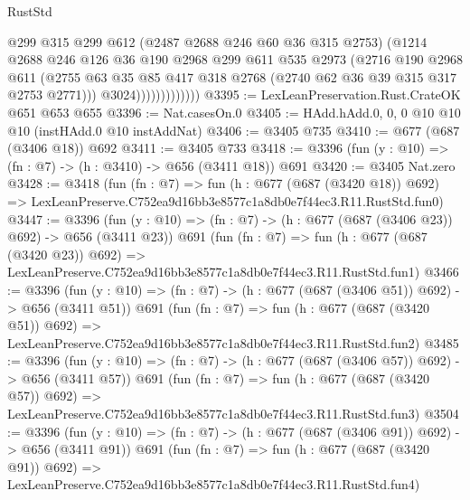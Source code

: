 \begin{lexlean}{RustStd}
\begin{coremodule}
                            @299
                            @315
                            @299
                            @612
                            (@2487 @2688 @246 @60 @36 @315 @2753)
                            (@1214
                              @2688
                              @246
                              @126
                              @36
                              @190
                              @2968
                              @299
                              @611
                              @535
                              @2973
                              (@2716
                                @190
                                @2968
                                @611
                                (@2755
                                  @63
                                  @35
                                  @85
                                  @417
                                  @318
                                  @2768
                                  (@2740 @62 @36 @39 @315 @317 @2753 @2771)))
                              @3024)))))))))))))
@3395 := LexLeanPreservation.Rust.CrateOK @651 @653 @655
@3396 := Nat.casesOn.{0}
@3405 := HAdd.hAdd.{0, 0, 0} @10 @10 @10 (instHAdd.{0} @10 instAddNat)
@3406 := @3405 @735
@3410 := @677 (@687 (@3406 @18)) @692
@3411 := @3405 @733
@3418 := @3396 (fun (y : @10) => (fn : @7) -> (h : @3410) -> @656 (@3411 @18)) @691
@3420 := @3405 Nat.zero
@3428 := @3418
    (fun (fn : @7) =>
    fun (h : @677 (@687 (@3420 @18)) @692) =>
    LexLeanPreserve.C752ea9d16bb3e8577c1a8db0e7f44ec3.R11.RustStd.fun0)
@3447 := @3396
    (fun (y : @10) => (fn : @7) -> (h : @677 (@687 (@3406 @23)) @692) -> @656 (@3411 @23))
    @691
    (fun (fn : @7) =>
    fun (h : @677 (@687 (@3420 @23)) @692) =>
    LexLeanPreserve.C752ea9d16bb3e8577c1a8db0e7f44ec3.R11.RustStd.fun1)
@3466 := @3396
    (fun (y : @10) => (fn : @7) -> (h : @677 (@687 (@3406 @51)) @692) -> @656 (@3411 @51))
    @691
    (fun (fn : @7) =>
    fun (h : @677 (@687 (@3420 @51)) @692) =>
    LexLeanPreserve.C752ea9d16bb3e8577c1a8db0e7f44ec3.R11.RustStd.fun2)
@3485 := @3396
    (fun (y : @10) => (fn : @7) -> (h : @677 (@687 (@3406 @57)) @692) -> @656 (@3411 @57))
    @691
    (fun (fn : @7) =>
    fun (h : @677 (@687 (@3420 @57)) @692) =>
    LexLeanPreserve.C752ea9d16bb3e8577c1a8db0e7f44ec3.R11.RustStd.fun3)
@3504 := @3396
    (fun (y : @10) => (fn : @7) -> (h : @677 (@687 (@3406 @91)) @692) -> @656 (@3411 @91))
    @691
    (fun (fn : @7) =>
    fun (h : @677 (@687 (@3420 @91)) @692) =>
    LexLeanPreserve.C752ea9d16bb3e8577c1a8db0e7f44ec3.R11.RustStd.fun4)

\end{coremodule}
\end{lexlean}
